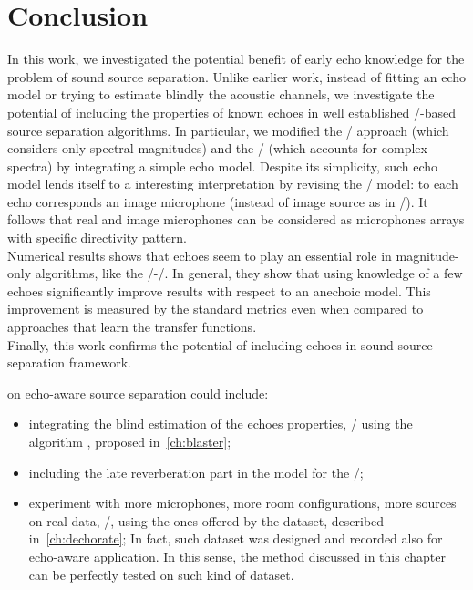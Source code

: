 \section{Conclusion}
In this work, we investigated the potential benefit of early echo knowledge for the problem of sound source separation.
Unlike earlier work, instead of fitting an echo model or trying to estimate blindly the acoustic channels,
we investigate the potential of including the properties of known echoes in well established \NMF/-based source separation algorithms.
In particular, we modified the \MU/ approach (which considers only spectral magnitudes) and the \EM/ (which accounts for complex spectra) by integrating a simple echo model.
Despite its simplicity, such echo model lends itself to a interesting interpretation by revising the \ISM/ model:
to each echo corresponds an image microphone (instead of image source as in \ISM/).
It follows that real and image microphones can be considered as microphones arrays with specific directivity pattern.
\\Numerical results shows that echoes seem to play an essential role in magnitude-only algorithms, like the \MU/-\NMF/.
In general, they show that using knowledge of a few echoes significantly improve results with respect to an anechoic model.
This improvement is measured by the standard metrics even when compared to approaches that learn the transfer functions.
\\Finally, this work confirms the potential of including echoes in sound source separation framework.

 on echo-aware source separation could include:
\begin{itemize}
    \item integrating the blind estimation of the echoes properties, \eg/ using the algorithm \blaster{}, proposed in~\cref{ch:blaster};
    \item including the late reverberation part in the model for the \RTFs/;
    \item experiment with more microphones, more room configurations, more sources on real data, \eg/, using the ones offered by the \dEchorate{} dataset, described in~\cref{ch:dechorate};
    In fact, such dataset was designed and recorded also for echo-aware application. In this sense, the method discussed in this chapter can be perfectly tested on such kind of dataset.
\end{itemize}
